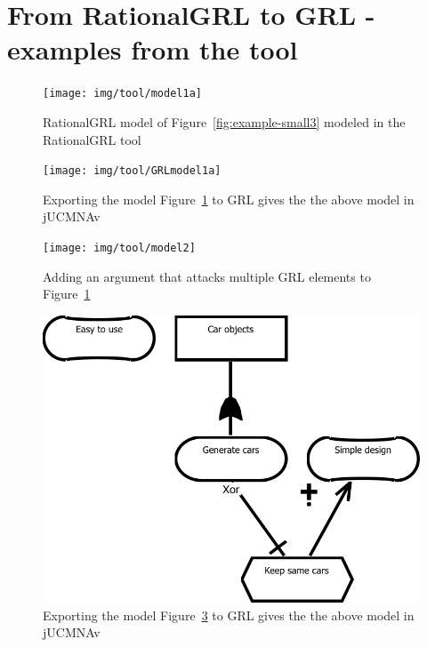 \section{From RationalGRL to GRL - examples from the tool}
\label{sect:tool-screenshots}

\begin{figure}[ht]
\centering
\texttt{[image: img/tool/model1a]}
\caption{RationalGRL model of Figure~\ref{fig:example-small3} modeled in the RationalGRL tool}
\label{fig:tool:figfrompaper}
\end{figure}

\begin{figure}[ht]
\centering
\texttt{[image: img/tool/GRLmodel1a]}
\caption{Exporting the model Figure~\ref{fig:tool:figfrompaper} to GRL gives the the above model in jUCMNAv}
\label{fig:tool:figfrompaper1}
\end{figure}

\begin{figure}[ht]
\centering
\texttt{[image: img/tool/model2]}
\caption{Adding an argument that attacks multiple GRL elements to Figure~\ref{fig:tool:figfrompaper}}
\label{fig:tool:multipleattack}
\end{figure}

\begin{figure}[ht]
\centering
\includegraphics[scale=0.3]{img/tool/GRLmodel1b}
\caption{Exporting the model Figure~\ref{fig:tool:multipleattack} to GRL gives the the above model in jUCMNAv}
\label{fig:tool:multipleattack1}
\end{figure}
